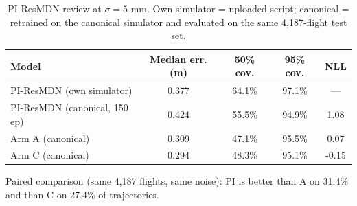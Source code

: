 \begin{table}[htbp]
\centering
\caption{PI-ResMDN review at $\sigma=5$ mm. Own simulator = uploaded script; canonical = retrained on the canonical simulator and evaluated on the same 4,187-flight test set.}
\label{tab:p0-pi}
\begin{tabular}{lcccc}
\toprule
Model & Median err. (m) & 50\% cov. & 95\% cov. & NLL \\
\midrule
PI-ResMDN (own simulator) & 0.377 & 64.1\% & 97.1\% & --- \\
PI-ResMDN (canonical, 150 ep) & 0.424 & 55.5\% & 94.9\% & 1.08 \\
Arm A (canonical) & 0.309 & 47.1\% & 95.5\% & 0.07 \\
Arm C (canonical) & 0.294 & 48.3\% & 95.1\% & -0.15 \\
\bottomrule
\end{tabular}
\par\smallskip\footnotesize Paired comparison (same 4,187 flights, same noise): PI is better than A on 31.4\% and than C on 27.4\% of trajectories.
\end{table}
